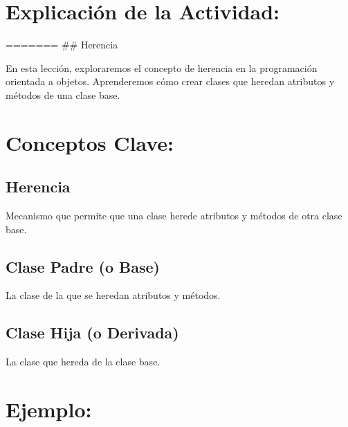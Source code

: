 \documentclass[
  a4paper,
  onepage,
  openany]{scrreprt}
\begin{document}
\hypertarget{explicaciuxf3n-de-la-actividad-54}{%
\section{Explicación de la
Actividad:}\label{explicaciuxf3n-de-la-actividad-54}}

======= \#\# Herencia

En esta lección, exploraremos el concepto de herencia en la programación
orientada a objetos. Aprenderemos cómo crear clases que heredan
atributos y métodos de una clase base.

\hypertarget{conceptos-clave-57}{%
\section{Conceptos Clave:}\label{conceptos-clave-57}}

\hypertarget{herencia-2}{%
\subsection{Herencia}\label{herencia-2}}

Mecanismo que permite que una clase herede atributos y métodos de otra
clase base.

\hypertarget{clase-padre-o-base-1}{%
\subsection{Clase Padre (o Base)}\label{clase-padre-o-base-1}}

La clase de la que se heredan atributos y métodos.

\hypertarget{clase-hija-o-derivada-1}{%
\subsection{Clase Hija (o Derivada)}\label{clase-hija-o-derivada-1}}

La clase que hereda de la clase base.

\hypertarget{ejemplo-57}{%
\section{Ejemplo:}\label{ejemplo-57}}
\end{document}
